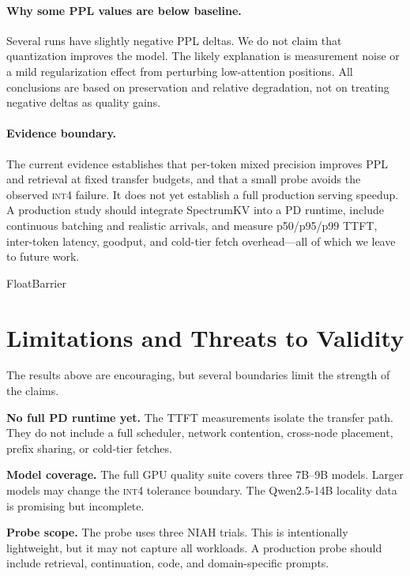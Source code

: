 \documentclass[11pt]{article}
\newcommand{\method}{SpectrumKV}
\newcommand{\niah}{NIAH}
\newcommand{\intiv}{\textsc{int4}}
\theoremstyle{plain}
\theoremstyle{definition}
\begin{document}
\paragraph{Why some PPL values are below baseline.}
Several runs have slightly negative PPL deltas.  We do not claim that quantization improves the model.  The likely explanation is measurement noise or a mild regularization effect from perturbing low-attention positions.  All conclusions are based on preservation and relative degradation, not on treating negative deltas as quality gains.

\paragraph{Evidence boundary.}
The current evidence establishes that per-token mixed precision improves PPL and retrieval at fixed transfer budgets, and that a small probe avoids the observed \intiv{} failure.  It does not yet establish a full production serving speedup.  A production study should integrate \method{} into a PD runtime, include continuous batching and realistic arrivals, and measure p50/p95/p99 TTFT, inter-token latency, goodput, and cold-tier fetch overhead---all of which we leave to future work.

FloatBarrier
\section{Limitations and Threats to Validity}
\label{sec:limitations}

The results above are encouraging, but several boundaries limit the strength of the claims.

\textbf{No full PD runtime yet.}  The TTFT measurements isolate the transfer path.  They do not include a full scheduler, network contention, cross-node placement, prefix sharing, or cold-tier fetches.

\textbf{Model coverage.}  The full GPU quality suite covers three 7B--9B models.  Larger models may change the \intiv{} tolerance boundary.  The Qwen2.5-14B locality data is promising but incomplete.

\textbf{Probe scope.}  The probe uses three \niah{} trials.  This is intentionally lightweight, but it may not capture all workloads.  A production probe should include retrieval, continuation, code, and domain-specific prompts.
\end{document}
